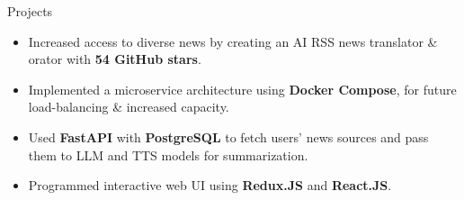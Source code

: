 \documentclass{resume} %
\begin{document}
\begin{workSection}{Projects}
	\customItem[
		title=\href{https://github.com/AshkanArabim/newsbridge}{Newsbridge \faExternalLink},
		duration=Team of 4 | September 2024 - December 2024,
	]
	\begin{itemize}
		\vspace{-0.5em}
		\itemsep -6pt {}
		\item Increased access to diverse news by creating an AI RSS news translator \& orator with \textbf{54 GitHub stars}.
		\item Implemented a microservice architecture using \textbf{Docker Compose}, for future load-balancing \& increased capacity.
		\item Used \textbf{FastAPI} with \textbf{PostgreSQL} to fetch users' news sources and pass them to LLM and TTS models for summarization.
		\item Programmed interactive web UI using \textbf{Redux.JS} and \textbf{React.JS}.
	\end{itemize}
	

\end{workSection}
\end{document}
